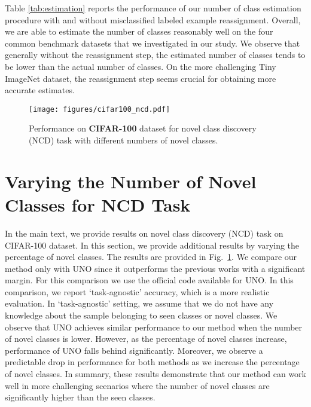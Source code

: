 \documentclass[runningheads]{eccv2022submission}
\begin{document}
Table \ref{tab:estimation} reports the performance of our number of class estimation procedure with and without misclassified labeled example reassignment. Overall, we are able to estimate the number of classes reasonably well on the four common benchmark datasets that we investigated in our study. We observe that generally without the reassignment step, the estimated number of classes tends to be lower than the actual number of classes. On the more challenging Tiny ImageNet dataset, the reassignment step seems crucial for obtaining more accurate estimates.



\begin{figure}[h]
\begin{center}
\texttt{[image: figures/cifar100\_ncd.pdf]}
\caption{Performance on \textbf{CIFAR-100} dataset for novel class discovery (NCD) task with different numbers of novel classes.}
\label{fig:ncd}
\vspace{-12mm}
\end{center}
\end{figure}


\section{Varying the Number of Novel Classes for NCD Task}
\label{sec:novel}
In the main text, we provide results on novel class discovery (NCD) task on CIFAR-100 dataset. In this section, we provide additional results by varying the percentage of novel classes. The results are provided in Fig.~\ref{fig:ncd}. We compare our method only with UNO since it outperforms the previous works with a significant margin. For this comparison we use the official code available for UNO. In this comparison, we report `task-agnostic' accuracy, which is a more realistic evaluation. In `task-agnostic' setting, we assume that we do not have any knowledge about the sample belonging to seen classes or novel classes. We observe that UNO achieves similar performance to our method when the number of novel classes is lower. However, as the percentage of novel classes increase, performance of UNO falls behind significantly. Moreover, we observe a predictable drop in performance for both methods as we increase the percentage of novel classes. In summary, these results demonstrate that our method can work well in more challenging scenarios where the number of novel classes are significantly higher than the seen classes.     
\end{document}
